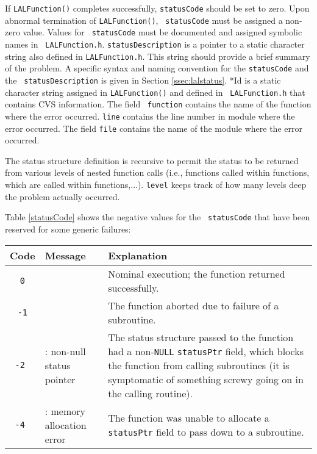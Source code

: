 \documentclass[]{ligodcc}
\begin{document}
\begin{enumerate}
If {\tt LALFunction()} completes successfully, {\tt statusCode} should
be set to zero. Upon abnormal termination of {\tt LALFunction()}, {\tt
statusCode} must be assigned a non-zero value. Values for {\tt
statusCode} must be documented and assigned symbolic names in {\tt
LALFunction.h}. {\tt statusDescription} is a pointer to a static
character string also defined in {\tt LALFunction.h}.  This string
should provide a brief summary of the problem.  A specific syntax and
naming convention for the  {\tt statusCode} and the {\tt
statusDescription} is given in Section \ref{ssec:lalstatus}.  *Id  is a static
character string assigned in {\tt LALFunction()} and defined in {\tt
LALFunction.h} that contains CVS information.  The field {\tt
function}
contains the name of the function  where the error occurred. {\tt line}
contains the line number in module  where the error occurred. The
field {\tt file} contains the name of the module where the error occurred. 

The status structure definition is recursive to permit the status to
be returned from various levels of nested function calls (i.e.,
functions called within functions, which are called within
functions,...).  {\tt level} keeps track of how many levels deep the problem
actually occurred.

Table \ref{statusCode} shows the negative values for the {\tt
statusCode} that have been reserved for some generic failures:


\begin{table}
\begin{center}
\begin{tabular}{|cp{4.2cm}p{6.5cm}|}
\hline
Code & Message & Explanation \\
\hline

{\tt 0} & & Nominal execution; the function returned
successfully. \\

{\tt -1} & \vspace{-1.4ex}{\tt Recursive error} & The function aborted due
to failure of a subroutine. \\

\tt -2 & \vspace{-1.4ex}{\tt INITSTATUS}: non-null status pointer & The
status structure passed to the function had a non-{\tt NULL}
{\tt statusPtr} field, which blocks the function from calling
subroutines (it is symptomatic of something screwy going on in the
calling routine). \\

\tt -4 & \vspace{-1.4ex}{\tt ATTATCHSTATUSPTR}: memory allocation error
& The function was unable to allocate a {\tt statusPtr} field to pass
down to a subroutine. \\


\end{tabular}
\end{center}
\end{table}
\end{enumerate}
\end{document}
